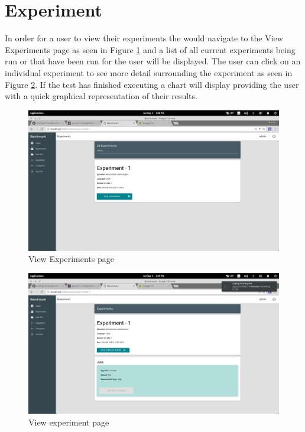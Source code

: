 \documentclass[11pt,a4paper]{article}
\begin{document}
\section{Experiment}
In order for a user to view their experiments the would navigate to the View Experiments
page as seen in Figure \ref{fig:viewExperiments} and a list of all current experiments 
being run or that have been run for the user will be displayed. The user can click on
an individual experiment to see more detail surrounding the experiment as seen in 
Figure \ref{fig:viewExperiment}. If the test has finished executing a chart will display
providing the user with a quick graphical representation of their results.
\begin{figure}[H]
	\begin{center}
		\includegraphics[scale=0.3]{../Images/User Manual/View Experiments.png}
		\caption{View Experiments page}
		\label{fig:viewExperiments}
	\end{center}  
\end{figure}

\begin{figure}[H]
	\begin{center}
		\includegraphics[scale=0.3]{../Images/User Manual/View Experiment.png}
		\caption{View experiment page}
		\label{fig:viewExperiment}
	\end{center}  
\end{figure}
\end{document}
